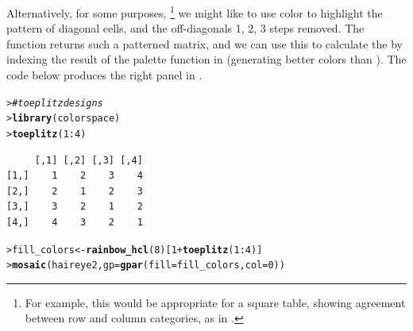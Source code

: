 \documentclass[10pt,krantz2]{krantz}\usepackage[]{graphicx}\usepackage[]{color}
\makeatletter
\newcommand{\hlnum}[1]{\textcolor[rgb]{0.686,0.059,0.569}{#1}}%
\newcommand{\hlcom}[1]{\textcolor[rgb]{0.678,0.584,0.686}{\textit{#1}}}%
\newcommand{\hlopt}[1]{\textcolor[rgb]{0,0,0}{#1}}%
\newcommand{\hlstd}[1]{\textcolor[rgb]{0.345,0.345,0.345}{#1}}%
\newcommand{\hlkwb}[1]{\textcolor[rgb]{0.69,0.353,0.396}{#1}}%
\newcommand{\hlkwc}[1]{\textcolor[rgb]{0.333,0.667,0.333}{#1}}%
\newcommand{\hlkwd}[1]{\textcolor[rgb]{0.737,0.353,0.396}{\textbf{#1}}}%
\newenvironment{kframe}{%
 \def\at@end@of@kframe{}%
 \ifinner\ifhmode%
  \def\at@end@of@kframe{\end{minipage}}%
  \begin{minipage}{\columnwidth}%
 \fi\fi%
 \def\FrameCommand##1{\hskip\@totalleftmargin \hskip-\fboxsep
 \colorbox{shadecolor}{##1}\hskip-\fboxsep
     \hskip-\linewidth \hskip-\@totalleftmargin \hskip\columnwidth}%
 \MakeFramed {\advance\hsize-\width
   \@totalleftmargin\z@ \linewidth\hsize
   \@setminipage}}%
 {\par\unskip\endMakeFramed%
 \at@end@of@kframe}
\newenvironment{knitrout}{}{} %
\renewenvironment{knitrout}{\small\renewcommand{\baselinestretch}{.85}}{} %
\makeatother
\begin{document}
Alternatively, for some purposes,%
\footnote{
For example, this would be appropriate for a square table, showing agreement between
row and column categories, as in .
}
we might like to use color to highlight the pattern
of diagonal cells, and the off-diagonals 1, 2, 3 steps removed.
The \R function  returns such a patterned matrix, and we can use this
to calculate the  by indexing the result of the
 palette function in  
(generating better colors than ).
The code below produces the right panel in
.
\begin{knitrout}
\color{fgcolor}\begin{kframe}
\begin{alltt}
\hlstd{> }\hlcom{# toeplitz designs}
\hlstd{> }\hlkwd{library}\hlstd{(colorspace)}
\hlstd{> }\hlkwd{toeplitz}\hlstd{(}\hlnum{1} \hlopt{:} \hlnum{4}\hlstd{)}
\end{alltt}
\begin{verbatim}
     [,1] [,2] [,3] [,4]
[1,]    1    2    3    4
[2,]    2    1    2    3
[3,]    3    2    1    2
[4,]    4    3    2    1
\end{verbatim}
\begin{alltt}
\hlstd{> }\hlstd{fill_colors} \hlkwb{<-} \hlkwd{rainbow_hcl}\hlstd{(}\hlnum{8}\hlstd{)[}\hlnum{1} \hlopt{+} \hlkwd{toeplitz}\hlstd{(}\hlnum{1} \hlopt{:} \hlnum{4}\hlstd{)]}
\hlstd{> }\hlkwd{mosaic}\hlstd{(haireye2,} \hlkwc{gp} \hlstd{=} \hlkwd{gpar}\hlstd{(}\hlkwc{fill} \hlstd{= fill_colors,} \hlkwc{col} \hlstd{=} \hlnum{0}\hlstd{))}
\end{alltt}
\end{kframe}
\end{knitrout}
\end{document}
